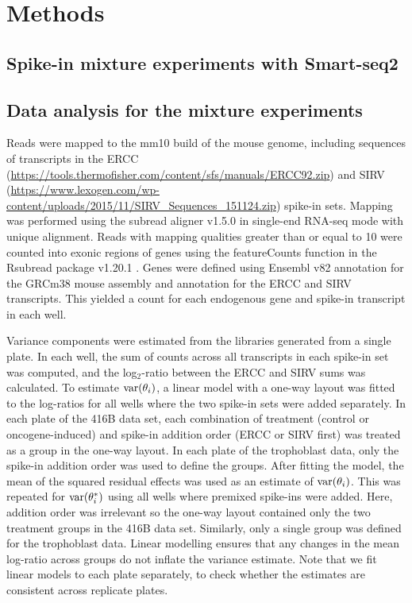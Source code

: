 \documentclass{article}
\begin{document}
\section{Methods}

\subsection{Spike-in mixture experiments with Smart-seq2}

\subsection{Data analysis for the mixture experiments}
Reads were mapped to the mm10 build of the mouse genome, including sequences of transcripts in the ERCC (\url{https://tools.thermofisher.com/content/sfs/manuals/ERCC92.zip}) and SIRV (\url{https://www.lexogen.com/wp-content/uploads/2015/11/SIRV_Sequences_151124.zip}) spike-in sets.
Mapping was performed using the subread aligner v1.5.0 \cite{liao2013subread} in single-end RNA-seq mode with unique alignment.
Reads with mapping qualities greater than or equal to 10 were counted into exonic regions of genes using the featureCounts function in the Rsubread package v1.20.1 \cite{liao2014featurecounts}.
Genes were defined using Ensembl v82 annotation for the GRCm38 mouse assembly and annotation for the ERCC and SIRV transcripts.
This yielded a count for each endogenous gene and spike-in transcript in each well.

Variance components were estimated from the libraries generated from a single plate.
In each well, the sum of counts across all transcripts in each spike-in set was computed, and the log$_2$-ratio between the ERCC and SIRV sums was calculated.
To estimate $\mbox{var}(\theta_i)$, a linear model with a one-way layout was fitted to the log-ratios for all wells where the two spike-in sets were added separately.
In each plate of the 416B data set, each combination of treatment (control or oncogene-induced) and spike-in addition order (ERCC or SIRV first) was treated as a group in the one-way layout.
In each plate of the trophoblast data, only the spike-in addition order was used to define the groups.
After fitting the model, the mean of the squared residual effects was used as an estimate of $\mbox{var}(\theta_i)$.
This was repeated for $\mbox{var}(\theta^*_i)$ using all wells where premixed spike-ins were added.
Here, addition order was irrelevant so the one-way layout contained only the two treatment groups in the 416B data set.
Similarly, only a single group was defined for the trophoblast data.
Linear modelling ensures that any changes in the mean log-ratio across groups do not inflate the variance estimate.
Note that we fit linear models to each plate separately, to check whether the estimates are consistent across replicate plates.
\end{document}

